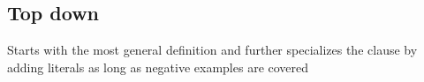 \documentclass[12pt, oneside]{report}
\numberwithin{definition}{chapter}
\numberwithin{theorem}{chapter}
\numberwithin{lemma}{chapter}
\numberwithin{Rule}{chapter}
\numberwithin{equation}{chapter}
\begin{document}
\subsection{Top down}
Starts with the most general definition and further specializes the clause by adding literals as long as negative examples are covered


%


\end{document}

